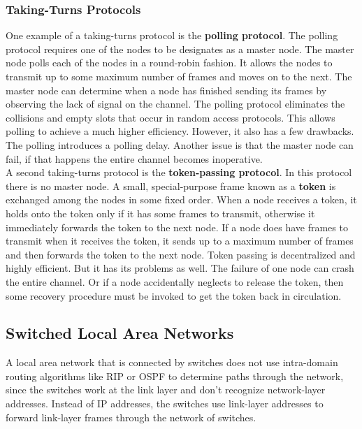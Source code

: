 \subsubsection{Taking-Turns Protocols}
One example of a taking-turns protocol is the \textbf{polling protocol}. The polling protocol requires one of the nodes to be designates as a master node. The master node polls each of the nodes in a round-robin fashion. It allows the nodes to transmit up to some maximum number of frames and moves on to the next. The master node can determine when a node has finished sending its frames by observing the lack of signal on the channel. The polling protocol eliminates the collisions and empty slots that occur in random access protocols. This allows polling to achieve a much higher efficiency. However, it also has a few drawbacks. The polling introduces a polling delay. Another issue is that the master node can fail, if that happens the entire channel becomes inoperative. \vspace{.3cm}\\

A second taking-turns protocol is the \textbf{token-passing protocol}. In this protocol there is no master node. A small, special-purpose frame known as a \textbf{token} is exchanged among the nodes in some fixed order. When a node receives a token, it holds onto the token only if it has some frames to transmit, otherwise it immediately forwards the token to the next node. If a node does have frames to transmit when it receives the token, it sends up to a maximum number of frames and then forwards the token to the next node. Token passing is decentralized and highly efficient. But it has its problems as well. The failure of one node can crash the entire channel. Or if a node accidentally neglects to release the token, then some recovery procedure must be invoked to get the token back in circulation.

\subsection{Switched Local Area Networks}
A local area network that is connected by switches does not use intra-domain routing algorithms like RIP or OSPF to determine paths through the network, since the switches work at the link layer and don't recognize network-layer addresses. Instead of IP addresses, the switches use link-layer addresses to forward link-layer frames through the network of switches.

